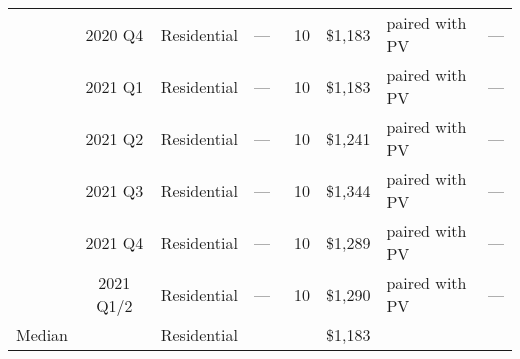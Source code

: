 \begin{tabular}{rccccclc}
\citet{EnergySage2021}                & 2020 Q4                                                                            & Residential                                                                & ---           & ~10                       & \$1,183                   & paired with PV                                                                                &     ---          \\
\citet{EnergySage2021}                & 2021 Q1                                                                            & Residential                                                                & ---           & ~10                       & \$1,183                   & paired with PV                                                                                &     ---         \\
\citet{EnergySage2021}                & 2021 Q2                                                                            & Residential                                                                & ---          & ~10                       & \$1,241                   & paired with PV                                                                                &      ---        \\
\citet{EnergySage2022a}                & 2021 Q3                                                                            & Residential                                                                & ---           & ~10                       & \$1,344                   & paired with PV                                                                                &     ---         \\
\citet{EnergySage2022a}                & 2021 Q4                                                                            & Residential                                                                & ---           & ~10                       & \$1,289                   & paired with PV                                                                                &     ---         \\
\citet{EnergySage2022b}                & 2021 Q1/2                                                                            & Residential                                                                & ---          & ~10                       & \$1,290                   & paired with PV                                                                                &      ---        \\ \hline
\multicolumn{1}{c}{Median}                     &                                                                                 & Residential                                                                &                          &                          & \$1,183                   &                                                                                                     &                        \\ \hline

\end{tabular}

